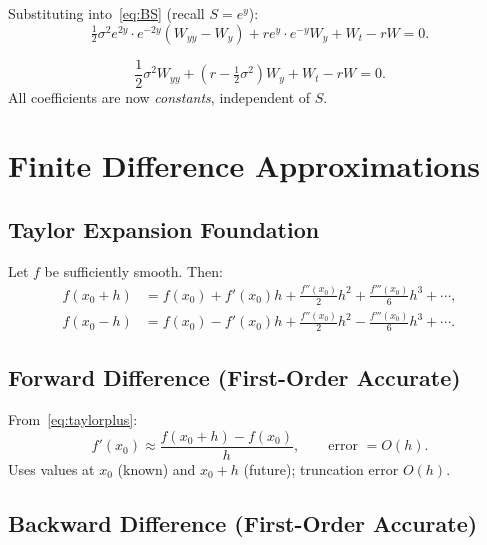 \documentclass[12pt,a4paper]{article}
\theoremstyle{plain}
\theoremstyle{definition}
\theoremstyle{remark}
\newcommand{\OO}[1]{O\!\left(#1\right)}
\begin{document}
Substituting into~\eqref{eq:BS} (recall $S=e^{y}$):
\[
  \tfrac{1}{2}\sigma^{2}e^{2y}\cdot e^{-2y}(W_{yy}-W_{y})
  +re^{y}\cdot e^{-y}W_{y}+W_{t}-rW=0.
\]

\begin{keybox}
\begin{equation}\label{eq:BSlog}
  \frac{1}{2}\sigma^{2}W_{yy}
  +\!\left(r-\tfrac{1}{2}\sigma^{2}\right)W_{y}
  +W_{t}-rW=0.
\end{equation}
All coefficients are now \emph{constants}, independent of $S$.
\end{keybox}

\section{Finite Difference Approximations}

\subsection{Taylor Expansion Foundation}

Let $f$ be sufficiently smooth.  Then:
\begin{align}
  f(x_{0}+h) &= f(x_{0})+f'(x_{0})h
               +\frac{f''(x_{0})}{2}h^{2}
               +\frac{f'''(x_{0})}{6}h^{3}+\cdots,
               \label{eq:taylorplus}\\
  f(x_{0}-h) &= f(x_{0})-f'(x_{0})h
               +\frac{f''(x_{0})}{2}h^{2}
               -\frac{f'''(x_{0})}{6}h^{3}+\cdots.
               \label{eq:taylorminus}
\end{align}

\subsection{Forward Difference (First-Order Accurate)}

From~\eqref{eq:taylorplus}:
\begin{equation}\label{eq:forward}
  \boxed{f'(x_{0})\approx\frac{f(x_{0}+h)-f(x_{0})}{h},
  \qquad\text{error }=\OO{h}.}
\end{equation}
Uses values at $x_{0}$ (known) and $x_{0}+h$ (future); truncation error $\OO{h}$.

\subsection{Backward Difference (First-Order Accurate)}
\end{document}
